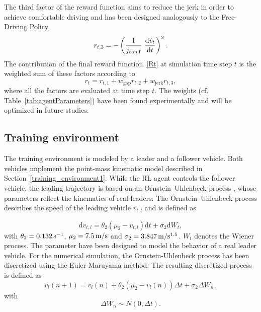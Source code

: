\documentclass[review]{elsarticle}
\providecommand{\sub}[1]{_{\mathrm{#1}}}  %
\providecommand{\3}{{\ss}}
\begin{document}
	
	
	The third factor of the reward function aims to reduce the jerk in
	order to achieve comfortable driving and has been designed analogously to the Free-Driving Policy, 
	\begin{equation}
	\label{eq:r3_CFP}
	r_{t,3} = -\left(\frac{1}{j\sub{comf}} \ \dv{\dot{v}_t}{t}\right)^2.
	\end{equation}
	The contribution of the final reward function~\eqref{Rt}  at simulation time step $t$ is the weighted
	sum of these factors according to
	\begin{equation}
	\label{rt2}
	r_t = r_{t,1} + w\sub{gap}r_{t,2}+w\sub{jerk}r_{t,3},
	\end{equation}
	where all the factors are evaluated at time step $t$. The weights (cf.
	Table~\ref{tab:agentParameters}) have been found experimentally and
	will be optimized in future studies.
	
	
	
	
	\subsection{Training environment}
	\label{training_environment2}
	The training environment is modeled by a leader and a follower vehicle. Both vehicles implement the point-mass kinematic model described in Section~\ref{training_environment1}. While the RL agent controls the follower vehicle, the leading trajectory is based on an Ornstein–Uhlenbeck process \citep{OU}, whose parameters
	reflect the kinematics of real leaders. The Ornstein–Uhlenbeck process describes
	the speed of the leading vehicle $v_{t,l}$ and is defined as 
	
	\begin{equation} \label{eq:AR1}
    \mathrm{d} v_{t,l}=\theta_2\left(\mu_2-v_{t,l}\right) \mathrm{d} t+\sigma_2 \mathrm{d} W_{t},
	\end{equation}
	with $\theta_2 = \unit[0.132]{s^{-1}}$, $\mu_2 = \unit[7.5]{m/s}$ and $\sigma_2 = \unit[3.847]{m/s^{1.5}}$. $W_{t}$ denotes the Wiener process. The parameter have been designed to model the behavior of a real leader vehicle.
	For the numerical simulation, the Ornstein-Uhlenbeck process has been discretized using the Euler-Maruyama method. The resulting discretized process is defined as
	\begin{equation} 
	v_{l}(n+1)=v_{l}(n)+\theta_2\left(\mu_2-v_{l}(n)\right) \Delta t+\sigma_2 \Delta W_{n},
	\end{equation}
	with 
	\begin{equation}
	\Delta W_{n} \sim N(0, \Delta t).
	\end{equation}
	
\end{document}
